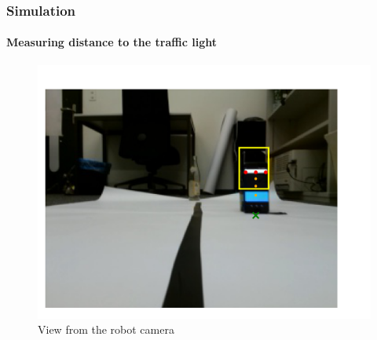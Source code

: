 \documentclass[dvipsnames,svgnames]{beamer}
\begin{document}
\begin{frame}
\frametitle{Simulation}
\framesubtitle{Measuring distance to the traffic light}
\begin{figure}[H]
\captionsetup{justification=centering,margin=0cm}
\centering
\includegraphics[scale=0.7]{img/rotated-img38.png}
\caption{View from the robot camera}
\end{figure}
\end{frame}
\end{document}
